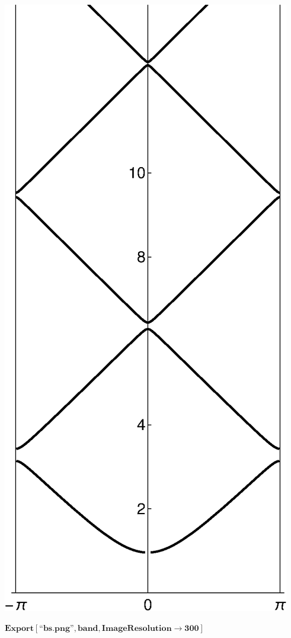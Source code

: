 {\includegraphics{chapters/appendices/KP_Mathematica/Kronig_Penney_model_transfer_matrix_gr7.eps}

\begin{doublespace}
\noindent\(\pmb{\text{Export}[\text{{``}bs.png{''}},\text{band},\text{ImageResolution}\to 300]}\)
\end{doublespace}

}
